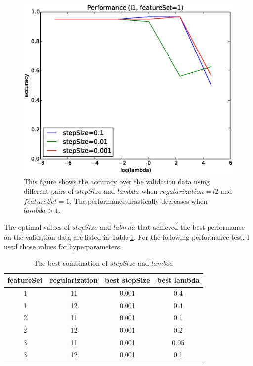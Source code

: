 \begin{figure}[hbtp]
\centering
\includegraphics[width=150mm]{performance_hyperparameter}
\caption{This figure shows the accuracy over the validation data using different pairs of $stepSize$ and $lambda$ when $regularization=l2$ and $featureSet=1$. The performance drastically decreases when $lambda > 1$.}
\label{fig:performance_hyperparameter}
\end{figure}

The optimal values of $stepSize$ and $labmda$ that achieved the best performance on the validation data are listed in Table \ref{tab:best_hyperparameters}. For the following performance test, I used those values for hyperparameters.

\begin{table}[htb]
  \begin{center}
  \begin{tabular}{|c|c||c|c|} \hline
    featureSet & regularization & best stepSize & best  lambda \\ \hline
    1 & 11 & 0.001 & 0.4 \\ \hline
    1 & 12 & 0.001 & 0.4 \\ \hline
    2 & 11 & 0.001 & 0.1 \\ \hline
    2 & 12 & 0.001 & 0.2 \\ \hline
    3 & 11 & 0.001 & 0.05 \\ \hline
    3 & 12 & 0.001 & 0.1 \\ \hline
  \end{tabular}
  \caption{The best combination of $stepSize$ and $lambda$}
  \label{tab:best_hyperparameters}
  \end{center}
\end{table}


